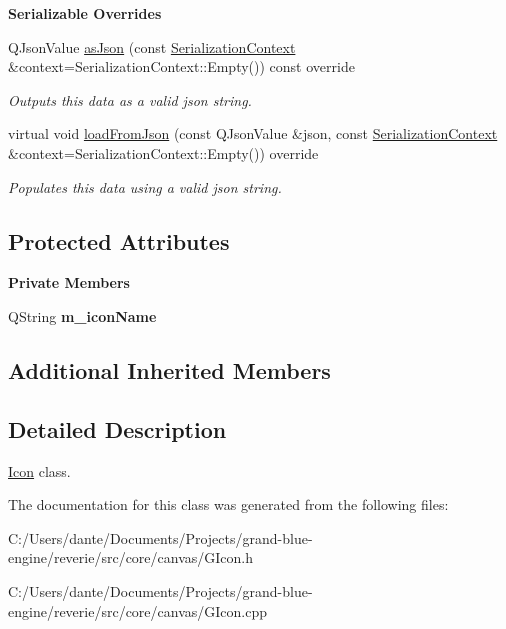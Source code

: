 \begin{Indent}\textbf{ Serializable Overrides}\par
\begin{DoxyCompactItemize}
\item 
\mbox{\label{classrev_1_1_icon_abe623ff9743234e9b14e7491e2d5ce99}} 
Q\+Json\+Value \mbox{\hyperlink{classrev_1_1_icon_abe623ff9743234e9b14e7491e2d5ce99}{as\+Json}} (const \mbox{\hyperlink{structrev_1_1_serialization_context}{Serialization\+Context}} \&context=Serialization\+Context\+::\+Empty()) const override
\begin{DoxyCompactList}\small\item\em Outputs this data as a valid json string. \end{DoxyCompactList}\item 
\mbox{\label{classrev_1_1_icon_a7d9e06ba68fe87de8244f5c8156ef1da}} 
virtual void \mbox{\hyperlink{classrev_1_1_icon_a7d9e06ba68fe87de8244f5c8156ef1da}{load\+From\+Json}} (const Q\+Json\+Value \&json, const \mbox{\hyperlink{structrev_1_1_serialization_context}{Serialization\+Context}} \&context=Serialization\+Context\+::\+Empty()) override
\begin{DoxyCompactList}\small\item\em Populates this data using a valid json string. \end{DoxyCompactList}\end{DoxyCompactItemize}
\end{Indent}
\subsection*{Protected Attributes}
\begin{Indent}\textbf{ Private Members}\par
\begin{DoxyCompactItemize}
\item 
\mbox{\label{classrev_1_1_icon_a2c341638a8eb36edcfad7d8f61d9c7a6}} 
Q\+String {\bfseries m\+\_\+icon\+Name}
\end{DoxyCompactItemize}
\end{Indent}
\subsection*{Additional Inherited Members}


\subsection{Detailed Description}
\mbox{\hyperlink{classrev_1_1_icon}{Icon}} class. 

The documentation for this class was generated from the following files\+:\begin{DoxyCompactItemize}
\item 
C\+:/\+Users/dante/\+Documents/\+Projects/grand-\/blue-\/engine/reverie/src/core/canvas/G\+Icon.\+h\item 
C\+:/\+Users/dante/\+Documents/\+Projects/grand-\/blue-\/engine/reverie/src/core/canvas/G\+Icon.\+cpp\end{DoxyCompactItemize}
